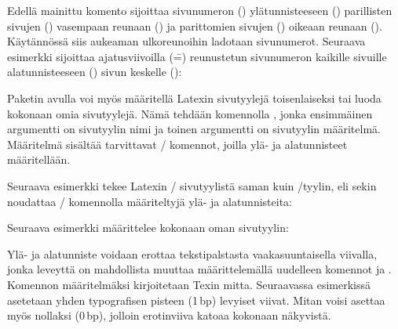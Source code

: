 \begin{koodilohkosis}
\fancyhf{}  %
\end{koodilohkosis}

\noindent
Edellä mainittu komento sijoittaa sivunumeron ()
ylätunnisteeseen () parillisten sivujen () vasempaan
reunaan () ja parittomien sivujen () oikeaan reunaan
(). Käytännössä siis aukeaman ulkoreunoihin ladotaan
sivunumerot. Seuraava esimerkki sijoittaa ajatusviivoilla (\==)
reunustetun sivunumeron kaikille sivuille alatunnisteeseen ()
sivun keskelle ():

\begin{koodilohkosis}
\fancyhf[FC]{-- \thepage\ --}
\end{koodilohkosis}

\noindent
Paketin  avulla voi myös määritellä Latexin
sivutyylejä toisenlaiseksi tai luoda kokonaan omia sivutyylejä. Nämä
tehdään komennolla , jonka ensimmäinen
argumentti on sivutyylin nimi ja toinen argumentti on sivutyylin
määritelmä. Määritelmä sisältää tarvittavat \-/
komennot, joilla ylä- ja alatunnisteet määritellään.

Seuraava esimerkki tekee Latexin \-/ sivutyylistä saman
kuin \-/tyylin, eli sekin noudattaa \-/
komennolla määriteltyjä ylä- ja alatunnisteita:

\begin{koodilohkosis}
\end{koodilohkosis}

\noindent
Seuraava esimerkki määrittelee kokonaan oman sivutyylin:

\begin{koodilohkosis}
\end{koodilohkosis}

\noindent
Ylä- ja alatunniste voidaan erottaa tekstipalstasta vaakasuuntaisella
viivalla, jonka leveyttä on mahdollista muuttaa määrittelemällä
uudelleen komennot  ja .
Komennon määritelmäksi kirjoitetaan Texin mitta. Seuraavassa esimerkissä
asetetaan yhden typografisen pisteen (1\,bp) levyiset viivat. Mitan
voisi asettaa myös nollaksi (0\,bp), jolloin erotinviiva katoaa kokonaan
näkyvistä.

